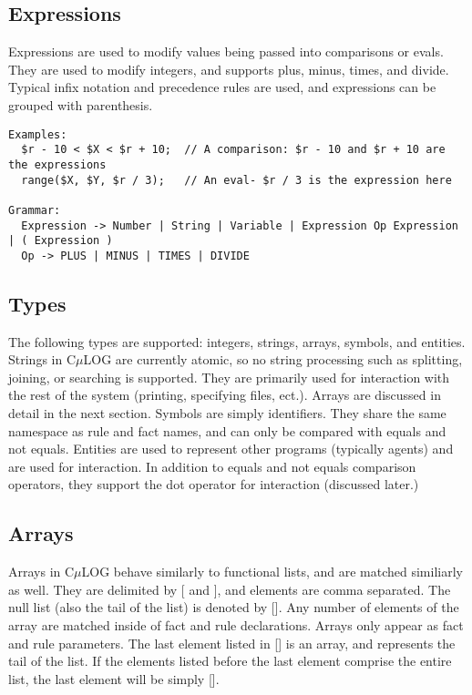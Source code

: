 \documentclass[onecolumn,titlepage]{article}
\begin{document}
\subsection{Expressions}
Expressions are used to modify values being passed into comparisons or evals.  They are
used to modify integers, and supports plus, minus, times, and divide.  Typical infix
notation and precedence rules are used, and expressions can be grouped with parenthesis.

\begin{verbatim}
Examples:
  $r - 10 < $X < $r + 10;  // A comparison: $r - 10 and $r + 10 are the expressions
  range($X, $Y, $r / 3);   // An eval- $r / 3 is the expression here

Grammar:
  Expression -> Number | String | Variable | Expression Op Expression | ( Expression )
  Op -> PLUS | MINUS | TIMES | DIVIDE
\end{verbatim}

\subsection{Types}
The following types are supported: integers, strings, arrays, symbols, and entities.
Strings in C$\mu$LOG are currently atomic, so no string processing such as splitting,
joining, or searching is supported.  They are primarily used for interaction with the
rest of the system (printing, specifying files, ect.).  Arrays are discussed in detail
in the next section.  Symbols are simply identifiers.  They share the same namespace as rule
and fact names, and can only be compared with equals and not equals.  Entities are used
to represent other programs (typically agents) and are used for interaction.  In addition
to equals and not equals comparison operators, they support the dot operator for interaction
(discussed later.)

\subsection{Arrays}
Arrays in C$\mu$LOG behave similarly to functional lists, and are matched similiarly as well.
They are delimited by [ and ], and elements are comma separated.  The null list (also the tail
of the list) is denoted by [].  Any number of elements of the array are matched inside of
fact and rule declarations.  Arrays only appear as fact and rule parameters.
The last element listed in [] is an array, and represents the tail of the list.  If the
elements listed before the last element comprise the entire list, the last element will be
simply [].
\end{document}
